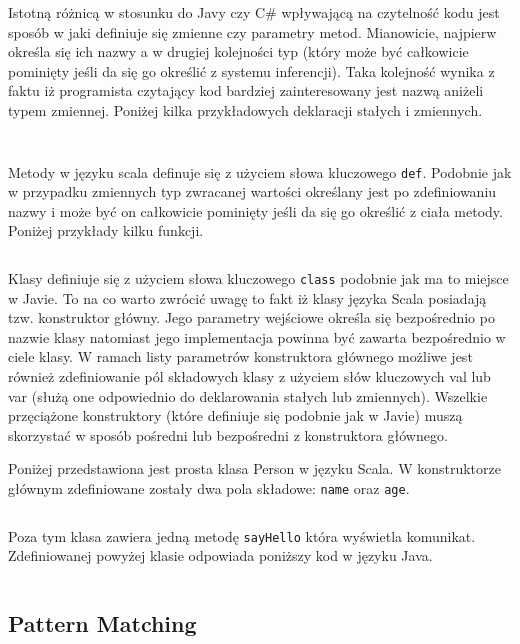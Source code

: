 \documentclass[brudnopis]{xmgr}
\begin{document}
Istotną różnicą w stosunku do Javy czy C\# wpływającą na czytelność kodu jest sposób w jaki definiuje się zmienne czy parametry metod. Mianowicie, najpierw określa się ich nazwy a w drugiej kolejności typ (który może być całkowicie pominięty jeśli da się go określić z systemu inferencji). Taka kolejność wynika z faktu iż programista czytający kod bardziej zainteresowany jest nazwą aniżeli typem zmiennej. Poniżej kilka przykładowych deklaracji stałych i zmiennych.

\inputminted{scala}{listings/scala/val-var-declarations.scala}
\inputminted{scala}{listings/scala/val-var-declarations.scala}

Metody w języku scala definuje się z użyciem słowa kluczowego \texttt{def}. Podobnie jak w przypadku zmiennych typ zwracanej wartości określany jest po zdefiniowaniu nazwy i może być on całkowicie pominięty jeśli da się go określić z ciała metody. Poniżej przykłady kilku funkcji.

\inputminted{scala}{listings/scala/functions-example.scala}

Klasy definiuje się z użyciem słowa kluczowego \texttt{class} podobnie jak ma to miejsce w Javie. To na co warto zwrócić uwagę to fakt iż klasy języka Scala posiadają tzw. konstruktor główny. Jego parametry wejściowe określa się bezpośrednio po nazwie klasy natomiast jego implementacja powinna być zawarta bezpośrednio w ciele klasy. W ramach listy parametrów konstruktora głównego możliwe jest również zdefiniowanie pól składowych klasy z użyciem słów kluczowych val lub var (służą one odpowiednio do deklarowania stałych lub zmiennych). Wszelkie przęciążone konstruktory (które definiuje się podobnie jak w Javie) muszą skorzystać w sposób pośredni lub bezpośredni z konstruktora głównego.

Poniżej przedstawiona jest prosta klasa Person w języku Scala. W konstruktorze głównym zdefiniowane zostały dwa pola składowe: \texttt{name} oraz \texttt{age}.

\inputminted{scala}{listings/scala/simple-class-person.scala}

Poza tym klasa zawiera jedną metodę \texttt{sayHello} która wyświetla komunikat.
Zdefiniowanej powyżej klasie odpowiada poniższy kod w języku Java.

\inputminted{scala}{listings/java/simple-class-person.java}

\subsection{Pattern Matching}
\end{document}
